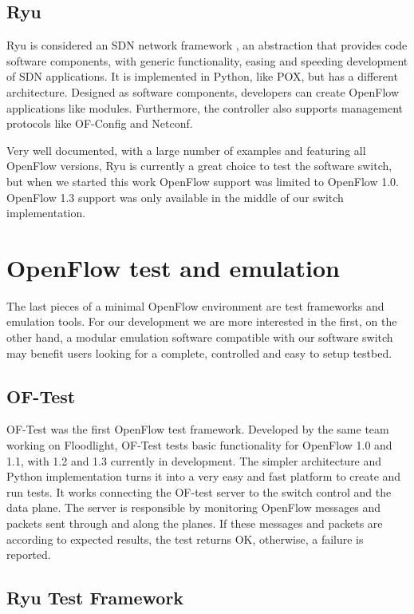     \subsection{Ryu}
    
    Ryu is considered an SDN network framework \cite{ryu}, an abstraction that provides code software components, with generic functionality, easing and speeding development of SDN applications. It is implemented in Python, like POX, but has a different architecture. Designed as software components, developers can create OpenFlow applications like modules. Furthermore, the controller also supports management protocols like OF-Config and Netconf.
    
    Very well documented, with a large number of examples and featuring all OpenFlow versions, Ryu is currently a great choice to test the software switch, but when we started this work OpenFlow support was limited to OpenFlow 1.0. OpenFlow 1.3 support was only available in the middle of our switch implementation.
 

\section{OpenFlow test and emulation}
\label{sec:testemulation}
    The last pieces of a minimal OpenFlow environment are  test frameworks and emulation tools. For our development we are more interested in the first, on the other hand, a modular emulation software compatible with our software switch may benefit users looking for a complete, controlled and easy to setup testbed. 
    
    \subsection{OF-Test}
    
    OF-Test was the first OpenFlow test framework. Developed by the same team working on Floodlight, OF-Test \cite{oftest} tests basic functionality for OpenFlow 1.0 and 1.1, with 1.2 and 1.3 currently in development. The simpler architecture and Python implementation turns it into a very easy and fast platform to create and run tests. It works connecting the OF-test server to the switch control and the data plane. The server is responsible by monitoring OpenFlow messages and packets sent through and along the planes. If these messages and packets are according to expected results, the test returns OK, otherwise, a failure is reported.
    
    \subsection{Ryu Test Framework}
    
